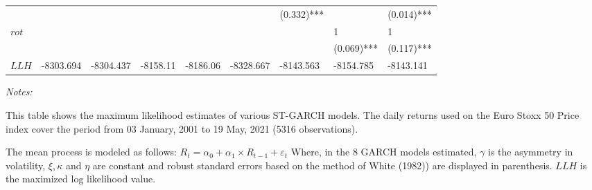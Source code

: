 \documentclass[a4paper, nobind]{templates/ociamthesis}
\begin{document}
\begin{landscape}
\begin{table}
\begin{threeparttable}
{\begin{tabular}[t]{lllllllll}
 &  &  &  &  &  & (0.332)*** &  & (0.014)***\\
$rot$ &  &  &  &  &  &  & 1 & 1\\
 &  &  &  &  &  &  & (0.069)*** & (0.117)***\\
\addlinespace
$LLH$ & -8303.694 & -8304.437 & -8158.11 & -8186.06 & -8328.667 & -8143.563 & -8154.785 & -8143.141\\
\bottomrule
\end{tabular}}
\begin{tablenotes}
\item \textit{Notes:} 
\item This table shows the maximum likelihood estimates of various ST-GARCH models. The daily returns used on the Euro Stoxx 50 Price index cover the period from 03 January, 2001 to 19 May, 2021 (5316 observations).
\item The mean process is modeled as follows: $R_t= \alpha_0+ \alpha_1 \times R_{t-1}+ \varepsilon_t$ Where, in the 8 GARCH models estimated, $\gamma$ is the asymmetry in volatility, $\xi, \kappa$ and $\eta$ are constant and robust standard errors based on the method of White (1982)) are displayed in parenthesis. $LLH$ is the maximized log likelihood value.
\end{tablenotes}
\end{threeparttable}
\end{table}
\end{landscape}

\clearpage
\newpage
\end{document}
